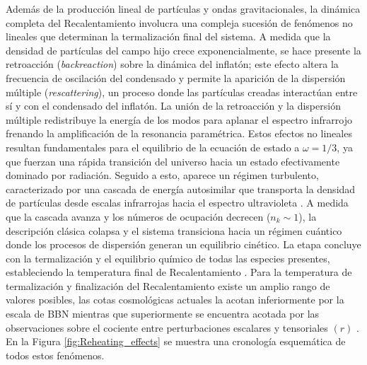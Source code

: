 Además de la producción lineal de partículas y ondas gravitacionales, la dinámica completa del Recalentamiento involucra una compleja sucesión de fenómenos no lineales que determinan la termalización final del sistema\cite{Elia_2025}. A medida que la densidad de partículas del campo hijo crece exponencialmente, se hace presente la retroacción (\textit{backreaction}) sobre la dinámica del inflatón; este efecto altera la frecuencia de oscilación del condensado y permite la aparición de la dispersión múltiple (\textit{rescattering}), un proceso donde las partículas creadas interactúan entre sí y con el condensado del inflatón. La unión de la retroacción y la dispersión múltiple redistribuye la energía de los modos para aplanar el espectro infrarrojo frenando la amplificación de la resonancia paramétrica. Estos efectos no lineales resultan fundamentales para el equilibrio de la ecuación de estado a $\omega = 1/3$, ya que fuerzan una rápida transición del universo hacia un estado efectivamente dominado por radiación. Seguido a esto, aparece un régimen turbulento, caracterizado por una cascada de energía autosimilar que transporta la densidad de partículas desde escalas infrarrojas hacia el espectro ultravioleta \cite{Micha_2003, Micha2004}. A medida que la cascada avanza y los números de ocupación decrecen ($n_k \sim 1$), la descripción clásica colapsa y el sistema transiciona hacia un régimen cuántico donde los procesos de dispersión generan un equilibrio cinético. La etapa concluye con la termalización y el equilibrio químico de todas las especies presentes, estableciendo la temperatura final de Recalentamiento \cite{Antusch_2022}. Para la temperatura de termalización y finalización del Recalentamiento existe un amplio rango de valores posibles, las cotas cosmológicas actuales la acotan inferiormente por la escala de BBN mientras que superiormente se encuentra acotada por las observaciones sobre el cociente entre perturbaciones escalares y tensoriales $(r)$ \cite{Planck, Martin2015}. En la Figura \ref{fig:Reheating_effects} se muestra una cronología esquemática de todos estos fenómenos.

